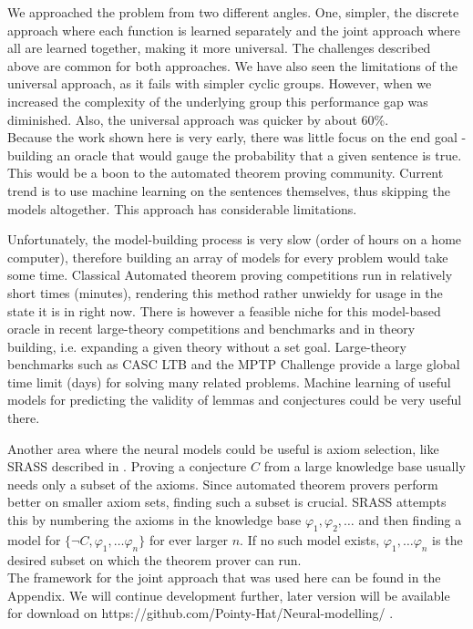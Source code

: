 We approached the problem from two different angles. One, simpler, the discrete approach where each function is learned separately and the joint approach where all are learned together, making it more universal. The challenges described above are common for both approaches. We have also seen the limitations of the universal approach, as it fails with simpler cyclic groups. However, when we increased the complexity of the underlying group this performance gap was diminished. Also, the universal approach was quicker by about 60\%.\\

Because the work shown here is very early, there was little focus on the end goal - building an oracle that would gauge the probability that a given sentence is true. This would be a boon to the automated theorem proving community. Current trend is to use machine learning on the sentences themselves, thus skipping the models altogether. This approach has considerable limitations.

Unfortunately, the model-building process is very slow (order of hours on a home computer), therefore building an array of models for every problem would take some time. Classical Automated theorem proving competitions run in relatively short times (minutes), rendering this method rather unwieldy for usage in the state it is in right now. There is however a feasible niche for this model-based oracle in recent large-theory competitions and benchmarks and in theory building, i.e. expanding a given theory without a set goal. Large-theory benchmarks such as CASC LTB and the MPTP Challenge provide a large global time limit (days) for solving many related
problems. Machine learning of useful models for predicting the
validity of lemmas and conjectures could be very useful there.

Another area where the neural models could be useful is axiom selection, like SRASS described in \cite{model_axiom_selection}. Proving a conjecture $C$ from a large knowledge base usually needs only a subset of the axioms. Since automated theorem provers perform better on smaller axiom sets, finding such a subset is crucial. SRASS attempts this by numbering the axioms in the knowledge base $\varphi_1,\varphi_2,\dots$ and then finding a model for $\{\neg C,\varphi_1,\dots \varphi_n\}$ for ever larger $n$. If no such model exists, $\varphi_1,\dots \varphi_n$ is the desired subset on which the theorem prover can run.\\

The framework for the joint approach that was used here can be found in the Appendix. We will continue development further, later version will be available for download on https://github.com/Pointy-Hat/Neural-modelling/ .